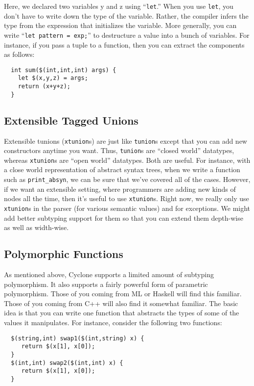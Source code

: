 Here, we declared two variables y and z using ``\texttt{let}.''  When
you use \texttt{let}, you don't have to write down the type of the
variable.  Rather, the compiler infers the type from the expression
that initializes the variable.  More generally, you can write
``\texttt{let pattern = exp;}'' to destructure a value into a bunch of
variables.  For instance, if you pass a tuple to a function, then you
can extract the components as follows:
\begin{verbatim}
  int sum($(int,int,int) args) {
    let $(x,y,z) = args;
    return (x+y+z);
  }
\end{verbatim}

\subsection{Extensible Tagged Unions}
Extensible tunions (\texttt{xtunion}s) are just like \texttt{tunion}s
except that you can add new constructors anytime you want.  Thus,
\texttt{tunion}s are ``closed world'' datatypes, whereas \texttt{xtunion}s
are ``open world'' datatypes.  Both are useful.  For instance, with a
close world representation of abstract syntax trees, when we write a
function such as \texttt{print_absyn}, we can be sure that we've covered
all of the cases.  However, if we want an extensible setting, where
programmers are adding new kinds of nodes all the time, then it's
useful to use \texttt{xtunion}s.  Right now, we really only use
\texttt{xtunion}s in the parser (for various semantic values) and for
exceptions.  We might add better subtyping support for them so that
you can extend them depth-wise as well as width-wise.


\subsection{Polymorphic Functions}
As mentioned above, Cyclone supports a limited amount of subtyping
polymorphism.  It also supports a fairly powerful form of parametric
polymorphism.  Those of you coming from ML or Haskell will find this
familiar.  Those of you coming from C++ will also find it somewhat
familiar.  The basic idea is that you can write one function that
abstracts the types of some of the values it manipulates.  For
instance, consider the following two functions:
\begin{verbatim}
  $(string,int) swap1($(int,string) x) {
     return $(x[1], x[0]);
  }
  $(int,int) swap2($(int,int) x) {
     return $(x[1], x[0]);
  }
\end{verbatim}


